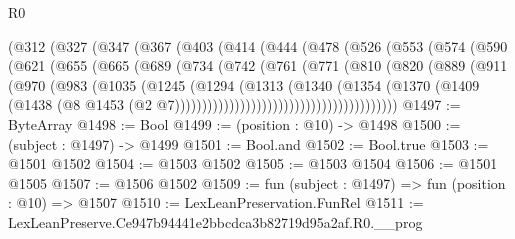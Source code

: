 \begin{lexlean}{R0}
\begin{coremodule}
            (@312
              (@327
                (@347
                  (@367
                    (@403
                      (@414
                        (@444
                          (@478
                            (@526
                              (@553
                                (@574
                                  (@590
                                    (@621
                                      (@655
                                        (@665
                                          (@689
                                            (@734
                                              (@742
                                                (@761
                                                  (@771
                                                    (@810
                                                      (@820
                                                        (@889
                                                          (@911
                                                            (@970
                                                              (@983
                                                                (@1035
                                                                  (@1245
                                                                    (@1294
                                                                      (@1313
                                                                        (@1340
                                                                          (@1354
                                                                            (@1370
                                                                              (@1409
                                                                                (@1438
                                                                                  (@8
                                                                                    @1453
                                                                                    (@2
                                                                                      @7)))))))))))))))))))))))))))))))))))))))))
@1497 := ByteArray
@1498 := Bool
@1499 := (position : @10) -> @1498
@1500 := (subject : @1497) -> @1499
@1501 := Bool.and
@1502 := Bool.true
@1503 := @1501 @1502
@1504 := @1503 @1502
@1505 := @1503 @1504
@1506 := @1501 @1505
@1507 := @1506 @1502
@1509 := fun (subject : @1497) => fun (position : @10) => @1507
@1510 := LexLeanPreservation.FunRel
@1511 := LexLeanPreserve.Ce947b94441e2bbcdca3b82719d95a2af.R0.__prog

\end{coremodule}
\end{lexlean}
